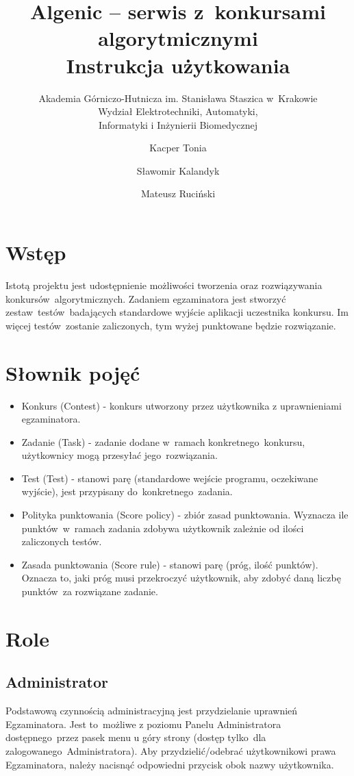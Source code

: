 \documentclass{article}
\title{Algenic -- serwis z~konkursami algorytmicznymi\\
Instrukcja użytkowania}
\subtitle{Akademia Górniczo-Hutnicza im. Stanisława Staszica w~Krakowie\\
	Wydział Elektrotechniki, Automatyki,\\
	Informatyki i Inżynierii Biomedycznej}
\author{Kacper Tonia\and
		Sławomir Kalandyk\and
		Mateusz Ruciński}
\date{}
\begin{document}
\maketitle

\section{Wstęp}
Istotą projektu jest udostępnienie możliwości tworzenia oraz rozwiązywania konkursów~algorytmicznych. Zadaniem egzaminatora jest stworzyć zestaw~testów~badających standardowe wyjście aplikacji uczestnika konkursu. Im więcej testów~zostanie zaliczonych, tym wyżej punktowane będzie rozwiązanie.

\section{Słownik pojęć}
\begin{itemize}
	\item Konkurs (Contest) - konkurs utworzony przez użytkownika z uprawnieniami egzaminatora. 
	\item Zadanie (Task) - zadanie dodane w~ramach konkretnego~konkursu, użytkownicy mogą przesyłać jego~rozwiązania.
	\item Test (Test) - stanowi parę (standardowe wejście programu, oczekiwane wyjście), jest przypisany do~konkretnego~zadania.
	\item Polityka punktowania (Score policy) - zbiór zasad punktowania. Wyznacza ile punktów~w~ramach zadania zdobywa użytkownik zależnie od ilości zaliczonych testów.
	\item Zasada punktowania (Score rule) - stanowi parę (próg, ilość punktów). Oznacza to, jaki próg musi przekroczyć użytkownik, aby zdobyć daną liczbę punktów~za rozwiązane zadanie.
\end{itemize}

\section{Role}
\subsection{Administrator}
Podstawową czynnością administracyjną jest przydzielanie uprawnień Egzaminatora. Jest to~możliwe z poziomu Panelu Administratora dostępnego~przez pasek menu u góry strony (dostęp tylko~dla zalogowanego~Administratora). Aby przydzielić/odebrać użytkownikowi prawa Egzaminatora, należy nacisnąć odpowiedni przycisk obok nazwy użytkownika.
\end{document}
